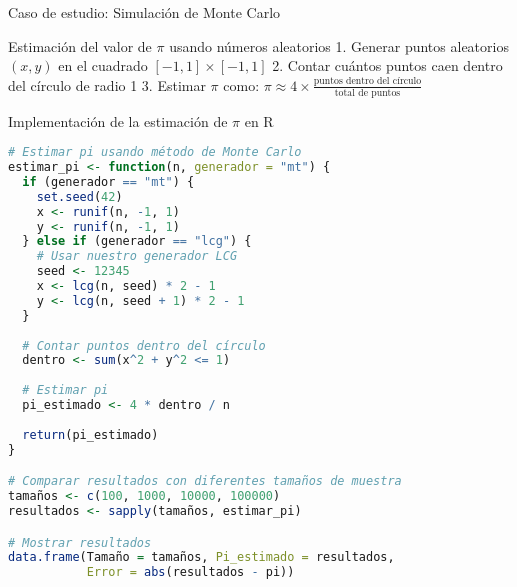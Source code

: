 \documentclass[aspectratio=169]{beamer}
\begin{document}
\begin{frame}{Caso de estudio: Simulación de Monte Carlo}
    \begin{block}{Estimación del valor de $\pi$ usando números aleatorios}
        1. Generar puntos aleatorios $(x,y)$ en el cuadrado $[-1,1] \times [-1,1]$
        2. Contar cuántos puntos caen dentro del círculo de radio 1
        3. Estimar $\pi$ como: $\pi \approx 4 \times \frac{\text{puntos dentro del círculo}}{\text{total de puntos}}$
    \end{block}
    
\end{frame}

\begin{frame}{Implementación de la estimación de $\pi$ en R}
    \begin{lstlisting}[language=R]
# Estimar pi usando método de Monte Carlo
estimar_pi <- function(n, generador = "mt") {
  if (generador == "mt") {
    set.seed(42)
    x <- runif(n, -1, 1)
    y <- runif(n, -1, 1)
  } else if (generador == "lcg") {
    # Usar nuestro generador LCG
    seed <- 12345
    x <- lcg(n, seed) * 2 - 1
    y <- lcg(n, seed + 1) * 2 - 1
  }
  
  # Contar puntos dentro del círculo
  dentro <- sum(x^2 + y^2 <= 1)
  
  # Estimar pi
  pi_estimado <- 4 * dentro / n
  
  return(pi_estimado)
}

# Comparar resultados con diferentes tamaños de muestra
tamaños <- c(100, 1000, 10000, 100000)
resultados <- sapply(tamaños, estimar_pi)

# Mostrar resultados
data.frame(Tamaño = tamaños, Pi_estimado = resultados, 
           Error = abs(resultados - pi))
    \end{lstlisting}
\end{frame}
\end{document}
